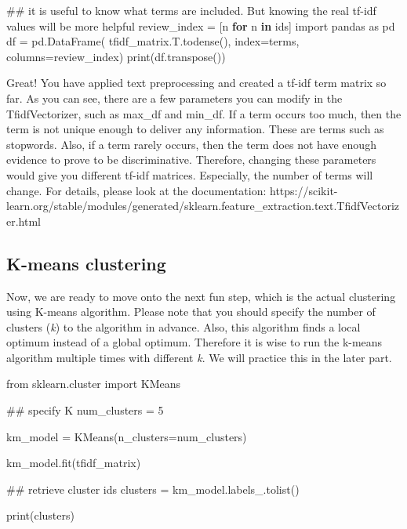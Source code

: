 \documentclass[
  letterpaper,
]{scrbook}
\newenvironment{Shaded}{\begin{snugshade}}{\end{snugshade}}
\newcommand{\BuiltInTok}[1]{\textcolor[rgb]{0.00,0.23,0.31}{#1}}
\newcommand{\CommentTok}[1]{\textcolor[rgb]{0.37,0.37,0.37}{#1}}
\newcommand{\ControlFlowTok}[1]{\textcolor[rgb]{0.00,0.23,0.31}{\textbf{#1}}}
\newcommand{\DecValTok}[1]{\textcolor[rgb]{0.68,0.00,0.00}{#1}}
\newcommand{\ImportTok}[1]{\textcolor[rgb]{0.00,0.46,0.62}{#1}}
\newcommand{\KeywordTok}[1]{\textcolor[rgb]{0.00,0.23,0.31}{\textbf{#1}}}
\newcommand{\NormalTok}[1]{\textcolor[rgb]{0.00,0.23,0.31}{#1}}
\newcommand{\OperatorTok}[1]{\textcolor[rgb]{0.37,0.37,0.37}{#1}}
\begin{document}
\begin{Shaded}
\begin{Highlighting}[]
\CommentTok{\#\# it is useful to know what terms are included. But knowing the real tf{-}idf values will be more helpful}
\NormalTok{review\_index }\OperatorTok{=}\NormalTok{ [n }\ControlFlowTok{for}\NormalTok{ n }\KeywordTok{in}\NormalTok{ ids]}
\ImportTok{import}\NormalTok{ pandas }\ImportTok{as}\NormalTok{ pd}
\NormalTok{df }\OperatorTok{=}\NormalTok{ pd.DataFrame(}
\NormalTok{tfidf\_matrix.T.todense(), index}\OperatorTok{=}\NormalTok{terms, columns}\OperatorTok{=}\NormalTok{review\_index)}
\BuiltInTok{print}\NormalTok{(df.transpose())}
\end{Highlighting}
\end{Shaded}

Great! You have applied text preprocessing and created a tf-idf term
matrix so far. As you can see, there are a few parameters you can modify
in the TfidfVectorizer, such as max\_df and min\_df. If a term occurs
too much, then the term is not unique enough to deliver any information.
These are terms such as stopwords. Also, if a term rarely occurs, then
the term does not have enough evidence to prove to be discriminative.
Therefore, changing these parameters would give you different tf-idf
matrices. Especially, the number of terms will change. For details,
please look at the documentation:
https://scikit-learn.org/stable/modules/generated/sklearn.feature\_extraction.text.TfidfVectorizer.html

\subsection*{K-means clustering}\label{k-means-clustering}

Now, we are ready to move onto the next fun step, which is the actual
clustering using K-means algorithm. Please note that you should specify
the number of clusters (\emph{k}) to the algorithm in advance. Also,
this algorithm finds a local optimum instead of a global optimum.
Therefore it is wise to run the k-means algorithm multiple times with
different \emph{k}. We will practice this in the later part.

\begin{Shaded}
\begin{Highlighting}[]
\ImportTok{from}\NormalTok{ sklearn.cluster }\ImportTok{import}\NormalTok{ KMeans}

\CommentTok{\#\# specify K}
\NormalTok{num\_clusters }\OperatorTok{=} \DecValTok{5}

\NormalTok{km\_model }\OperatorTok{=}\NormalTok{ KMeans(n\_clusters}\OperatorTok{=}\NormalTok{num\_clusters)}

\NormalTok{km\_model.fit(tfidf\_matrix)}

\CommentTok{\#\# retrieve cluster ids}
\NormalTok{clusters }\OperatorTok{=}\NormalTok{ km\_model.labels\_.tolist()}

\BuiltInTok{print}\NormalTok{(clusters)}
\end{Highlighting}
\end{Shaded}
\end{document}
